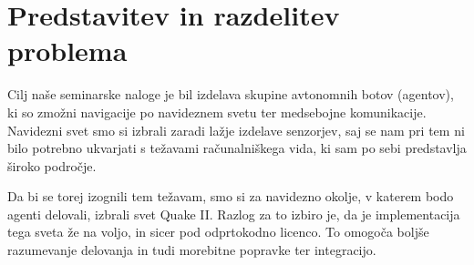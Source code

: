 \documentclass[a4paper,10pt]{article}
\begin{document}

\tableofcontents
\pagebreak

\section{Predstavitev in razdelitev problema}

Cilj naše seminarske naloge je bil izdelava skupine avtonomnih botov (agentov), ki so zmožni navigacije po navideznem svetu ter medsebojne komunikacije. Navidezni svet smo si izbrali zaradi lažje izdelave senzorjev, saj se nam pri tem ni bilo potrebno ukvarjati s težavami računalniškega vida, ki sam po sebi predstavlja široko področje.

Da bi se torej izognili tem težavam, smo si za navidezno okolje, v katerem bodo agenti delovali, izbrali svet Quake II. Razlog za to izbiro je, da je implementacija tega sveta že na voljo, in sicer pod odprtokodno licenco. To omogoča boljše razumevanje delovanja in tudi morebitne popravke ter integracijo.
\end{document}
